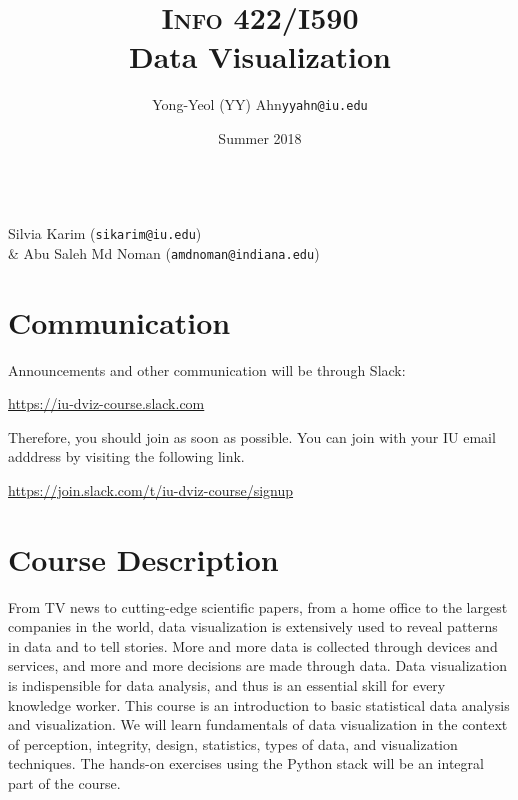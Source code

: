 \documentclass[11pt,article,oneside]{memoir} %
\makeatletter
\def\myauthor{Author}
\def\mytitle{Title}
\def\myemail{yyahn@iu.edu}
\def\myauthor{Yong-Yeol (YY) Ahn}
\def\mytitle{{\normalsize \textsc{Info} 422/I590} \\ \HUGE Data Visualization}
\makeatother
\begin{document}

\title{\LARGE \mytitle} %
\author{\Large\myauthor \newline \footnotesize\texttt{\noindent\myemail}}
\date{Summer 2018} %

\maketitle 

\vspace{-20pt}{\bfseries Assistant Instructors} \\ Silvia Karim (\texttt{sikarim@iu.edu})  \\ &
Abu Saleh Md Noman (\texttt{amdnoman@indiana.edu}) 
\section{Communication} %

Announcements and other communication will be through Slack: 

\url{https://iu-dviz-course.slack.com}

Therefore, you should join as soon as possible. You can join with your IU email adddress by visiting the following link. 

\url{https://join.slack.com/t/iu-dviz-course/signup}

\section{Course Description}%

From TV news to cutting-edge scientific papers, from a home office to the
largest companies in the world, data visualization is extensively used to
reveal patterns in data and to tell stories. More and more data is collected
through devices and services, and more and more decisions are made through
data. Data visualization is indispensible for data analysis, and thus is an
essential skill for every knowledge worker.  This course is an introduction to
basic statistical data analysis and visualization.  We will learn fundamentals
of data visualization in the context of perception, integrity, design,
statistics, types of data, and visualization techniques.  The hands-on
exercises using the Python stack will be an integral part of the course. 
\end{document}
